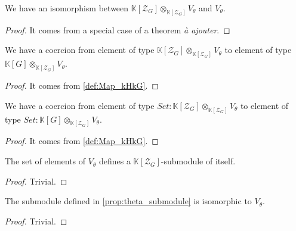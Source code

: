\begin{proposition}
    \label{prop:module_sub_rep_iso}
    \leanok
    We have an isomorphism between $\mathbb{K}[\mathcal{Z}_G]\otimes_{\mathbb{K}[\mathcal{Z}_G]}V_\theta$ and $V_\theta$.
\end{proposition}
\begin{proof}
    \leanok
    It comes from a special case of a theorem \textit{à ajouter}.
\end{proof}

\begin{proposition}[Coercion]
    \label{prop:induced_rep_coe}
    \leanok 
   We have a coercion from element of type $\mathbb{K}[\mathcal{Z}_G]\otimes_{\mathbb{K}[\mathcal{Z}_G]}V_\theta$
   to element of type $\mathbb{K}[G]\otimes_{\mathbb{K}[\mathcal{Z}_G]}V_\theta$.
\end{proposition}
\begin{proof}
    \leanok
    It comes from \ref{def:Map_kHkG}.
\end{proof}

\begin{proposition}
    \label{prop:induced_rep_coe_set}
    \leanok 
   We have a coercion from element of type $Set : \mathbb{K}[\mathcal{Z}_G]\otimes_{\mathbb{K}[\mathcal{Z}_G]}V_\theta$
   to element of type $Set : \mathbb{K}[G]\otimes_{\mathbb{K}[\mathcal{Z}_G]}V_\theta$.
\end{proposition}
\begin{proof}
    \leanok
    It comes from \ref{def:Map_kHkG}.
\end{proof}


\begin{proposition}
    \label{prop:theta_submodule}
    \uses{}
    \leanok 
    The set of elements of $V_\theta$ defines a $\mathbb{K}[\mathcal{Z}_G]$-submodule of itself.
\end{proposition}
\begin{proof}
    \leanok
    Trivial.
\end{proof}

\begin{proposition}
    \label{prop:theta_submodule_triv}
    \leanok 
    The submodule defined in \ref{prop:theta_submodule} is isomorphic to $V_\theta$.
\end{proposition}
\begin{proof}
    \leanok
    Trivial.
\end{proof}

